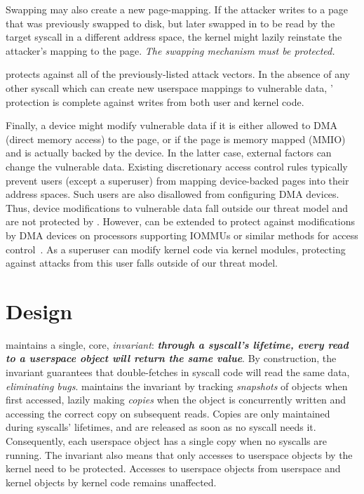 Swapping may also create a new page-mapping.
If the attacker writes to a page that was previously swapped
to disk, but later swapped in to be read by the target syscall in
a different address space, the kernel might lazily reinstate
the attacker's mapping to the page.
\emph{The swapping mechanism must be protected.}

\midas protects against all of the previously-listed attack vectors.
In the absence of any other syscall which can create new userspace
mappings to vulnerable data, \midas' protection is complete
against writes from both user and kernel code.

Finally, a device might modify vulnerable data if it is either
allowed to DMA (direct memory access) to the page, or if the page is memory 
mapped (MMIO) and is actually backed by the device.
In the latter case, external factors can change the vulnerable
data.
Existing discretionary access control rules typically prevent users
(except a superuser) from mapping device-backed pages into their
address spaces.
Such users are also disallowed from configuring DMA devices.
Thus, device modifications to vulnerable data fall outside
our threat model and are not protected by \midas.
However, \midas can be extended to protect against modifications by DMA devices
on processors supporting IOMMUs or similar methods for
access control~\cite{olsonbordercontrol}.
As a superuser can modify kernel code via kernel modules, protecting against 
attacks from this user falls outside of our threat model.


\section{\midas Design}
\label{sec:design}

\midas maintains a single, core, \emph{invariant}:
\textbf{\emph{through a syscall's lifetime, every read to a userspace object
will return the same value}}.
By construction, the invariant guarantees that double-fetches in syscall
code will read the same data, \emph{eliminating \tocttou bugs}.
\midas maintains the invariant by tracking \emph{snapshots} of objects
when first accessed, lazily making \emph{copies} when the object is concurrently
written and accessing the correct copy on subsequent reads.
Copies are only maintained during syscalls' lifetimes, and are released as
soon as no syscall needs it.
Consequently, each userspace object has a single copy when no syscalls are
running.
The invariant also means that only accesses to userspace objects by the kernel
need to be protected.
Accesses to userspace objects from userspace and kernel objects by kernel
code remains unaffected.

